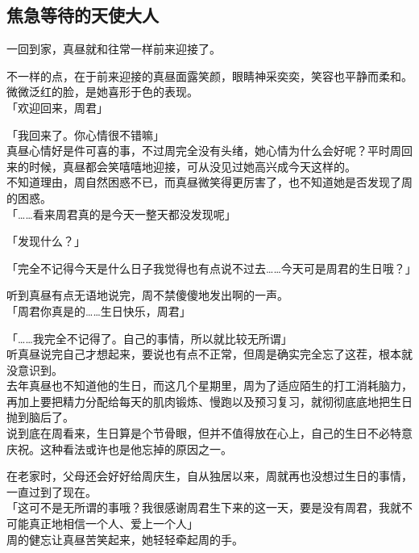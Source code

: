 \subsection{焦急等待的天使大人}

一回到家，真昼就和往常一样前来迎接了。

不一样的点，在于前来迎接的真昼面露笑颜，眼睛神采奕奕，笑容也平静而柔和。微微泛红的脸，是她喜形于色的表现。\\

「欢迎回来，周君」

「我回来了。你心情很不错嘛」\\

真昼心情好是件可喜的事，不过周完全没有头绪，她心情为什么会好呢？平时周回来的时候，真昼都会笑嘻嘻地迎接，可从没见过她高兴成今天这样的。\\

不知道理由，周自然困惑不已，而真昼微笑得更厉害了，也不知道她是否发现了周的困惑。\\

「……看来周君真的是今天一整天都没发现呢」

「发现什么？」

「完全不记得今天是什么日子我觉得也有点说不过去……今天可是周君的生日哦？」

听到真昼有点无语地说完，周不禁傻傻地发出啊的一声。\\

「周君你真是的……生日快乐，周君」

「……我完全不记得了。自己的事情，所以就比较无所谓」\\

听真昼说完自己才想起来，要说也有点不正常，但周是确实完全忘了这茬，根本就没意识到。\\

去年真昼也不知道他的生日，而这几个星期里，周为了适应陌生的打工消耗脑力，再加上要把精力分配给每天的肌肉锻炼、慢跑以及预习复习，就彻彻底底地把生日抛到脑后了。\\

说到底在周看来，生日算是个节骨眼，但并不值得放在心上，自己的生日不必特意庆祝。这种看法或许也是他忘掉的原因之一。

在老家时，父母还会好好给周庆生，自从独居以来，周就再也没想过生日的事情，一直过到了现在。\\

「这可不是无所谓的事哦？我很感谢周君生下来的这一天，要是没有周君，我就不可能真正地相信一个人、爱上一个人」\\

周的健忘让真昼苦笑起来，她轻轻牵起周的手。\\

